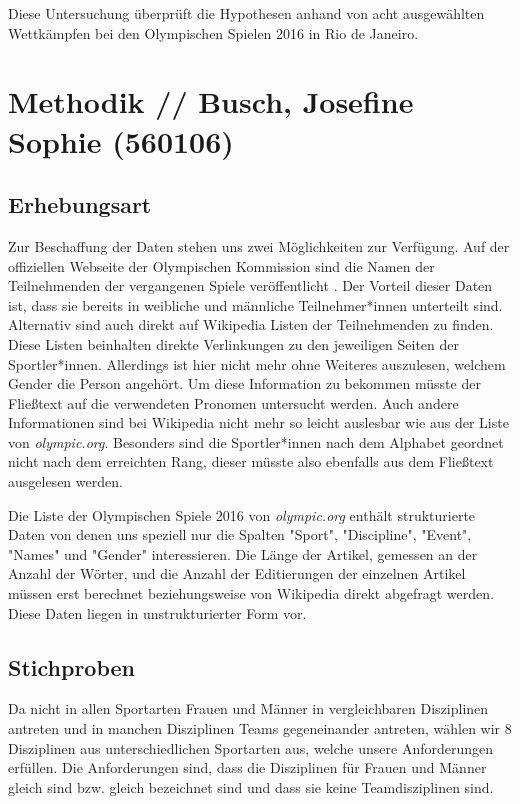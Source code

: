 \documentclass[11pt]{article}
\begin{document}
Diese Untersuchung überprüft die Hypothesen anhand von acht ausgewählten Wettkämpfen bei den Olympischen Spielen 2016 in Rio de Janeiro.

\section {Methodik // Busch, Josefine Sophie (560106)}
\label{igw}

\subsection {Erhebungsart}
Zur Beschaffung der Daten stehen uns zwei Möglichkeiten zur Verfügung. Auf der offiziellen Webseite der Olympischen Kommission sind die Namen der Teilnehmenden der vergangenen Spiele veröffentlicht \parencite{olympicResults}. Der Vorteil dieser Daten ist, dass sie bereits in weibliche und männliche Teilnehmer*innen unterteilt sind. Alternativ sind auch direkt auf Wikipedia Listen der Teilnehmenden zu finden. \parencite{wikiOlympicComp} Diese Listen beinhalten direkte Verlinkungen zu den jeweiligen Seiten der Sportler*innen. Allerdings ist hier nicht mehr ohne Weiteres auszulesen, welchem Gender die Person angehört. Um diese Information zu bekommen müsste der Fließtext auf die verwendeten Pronomen untersucht werden. Auch andere Informationen sind bei Wikipedia nicht mehr so leicht auslesbar wie aus der Liste von \textit{olympic.org}. Besonders sind die Sportler*innen nach dem Alphabet geordnet nicht nach dem erreichten Rang, dieser müsste also ebenfalls aus dem Fließtext ausgelesen werden.

Die Liste der Olympischen Spiele 2016 von \textit{olympic.org} enthält strukturierte Daten von denen uns speziell nur die Spalten "Sport", "Discipline", "Event", "Names" und "Gender" interessieren.
Die Länge der Artikel, gemessen an der Anzahl der Wörter, und die Anzahl der Editierungen der einzelnen Artikel müssen erst berechnet beziehungsweise von Wikipedia direkt abgefragt werden. Diese Daten liegen in unstrukturierter Form vor.

\subsection {Stichproben}
Da nicht in allen Sportarten Frauen und Männer in vergleichbaren Disziplinen antreten und in manchen Disziplinen Teams gegeneinander antreten, wählen wir 8 Disziplinen aus unterschiedlichen Sportarten aus, welche unsere Anforderungen erfüllen. Die Anforderungen sind, dass die Disziplinen für Frauen und Männer gleich sind bzw. gleich bezeichnet sind und dass sie keine Teamdisziplinen sind.
\end{document}
